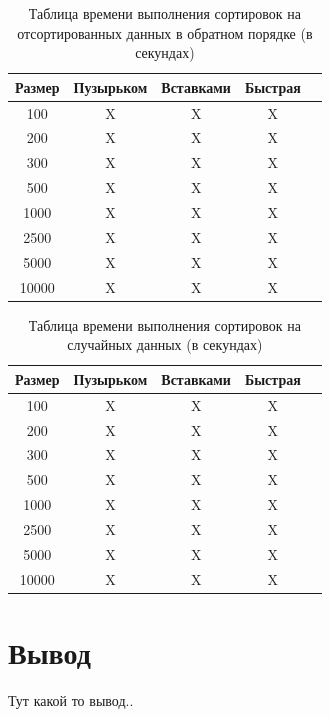 \documentclass[12pt]{report}
\begin{document}
\begin{table} [h!]
	\caption{Таблица времени выполнения сортировок на отсортированных данных в обратном порядке (в секундах)}
	\begin{center}
		\begin{tabular}{|c c c c c|} 
			\hline
			Размер & Пузырьком & Вставками & Быстрая &\\  
			\hline
			100 & X & X & X &\\
			\hline
			200 & X & X & X &\\
			\hline
			300 & X & X & X &\\
			\hline
			500 & X & X & X &\\
			\hline
			1000 & X & X & X &\\
			\hline
			2500 & X & X & X &\\
			\hline
			5000 & X & X & X &\\
			\hline
			10000 & X & X & X &\\
			\hline
		\end{tabular}
	\end{center}
\end{table}

\begin{table} [h!]
	\caption{Таблица времени выполнения сортировок на случайных данных (в секундах)}
	\begin{center}
		\begin{tabular}{|c c c c c|} 
			\hline
			Размер & Пузырьком & Вставками & Быстрая &\\  
			\hline
			100 & X & X & X &\\
			\hline
			200 & X & X & X &\\
			\hline
			300 & X & X & X &\\
			\hline
			500 & X & X & X &\\
			\hline
			1000 & X & X & X &\\
			\hline
			2500 & X & X & X &\\
			\hline
			5000 & X & X & X &\\
			\hline
			10000 & X & X & X &\\
			\hline
		\end{tabular}
	\end{center}
\end{table}

\section{Вывод}

Тут какой то вывод..
\end{document}
